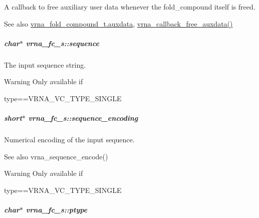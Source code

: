 A callback to free auxiliary user data whenever the fold\+\_\+compound itself is free\textquotesingle{}d. 

\begin{DoxySeeAlso}{See also}
\hyperlink{group__fold__compound_a20048e0c369e9f24b55423d600037c68}{vrna\+\_\+fold\+\_\+compound\+\_\+t.\+auxdata}, \hyperlink{group__fold__compound_ga3ae51bfd5fc3236652d1de4e3274b49b}{vrna\+\_\+callback\+\_\+free\+\_\+auxdata()} 
\end{DoxySeeAlso}
\subparagraph[{\texorpdfstring{sequence}{sequence}}]{\setlength{\rightskip}{0pt plus 5cm}char$\ast$ vrna\+\_\+fc\+\_\+s\+::sequence}\hypertarget{group__fold__compound_a87f6abcda89cfb7a486c97e1f5371525}{}\label{group__fold__compound_a87f6abcda89cfb7a486c97e1f5371525}


The input sequence string. 

\begin{DoxyWarning}{Warning}
Only available if\begin{DoxyVerb}type==VRNA_VC_TYPE_SINGLE \end{DoxyVerb}
 
\end{DoxyWarning}
\subparagraph[{\texorpdfstring{sequence\+\_\+encoding}{sequence_encoding}}]{\setlength{\rightskip}{0pt plus 5cm}short$\ast$ vrna\+\_\+fc\+\_\+s\+::sequence\+\_\+encoding}\hypertarget{group__fold__compound_a9934bdb695d35a3544285cbcc19f9763}{}\label{group__fold__compound_a9934bdb695d35a3544285cbcc19f9763}


Numerical encoding of the input sequence. 

\begin{DoxySeeAlso}{See also}
vrna\+\_\+sequence\+\_\+encode() 
\end{DoxySeeAlso}
\begin{DoxyWarning}{Warning}
Only available if\begin{DoxyVerb}type==VRNA_VC_TYPE_SINGLE \end{DoxyVerb}
 
\end{DoxyWarning}
\subparagraph[{\texorpdfstring{ptype}{ptype}}]{\setlength{\rightskip}{0pt plus 5cm}char$\ast$ vrna\+\_\+fc\+\_\+s\+::ptype}\hypertarget{group__fold__compound_a3fbea559f1d1976b2d67c215cdeee0b2}{}\label{group__fold__compound_a3fbea559f1d1976b2d67c215cdeee0b2}


